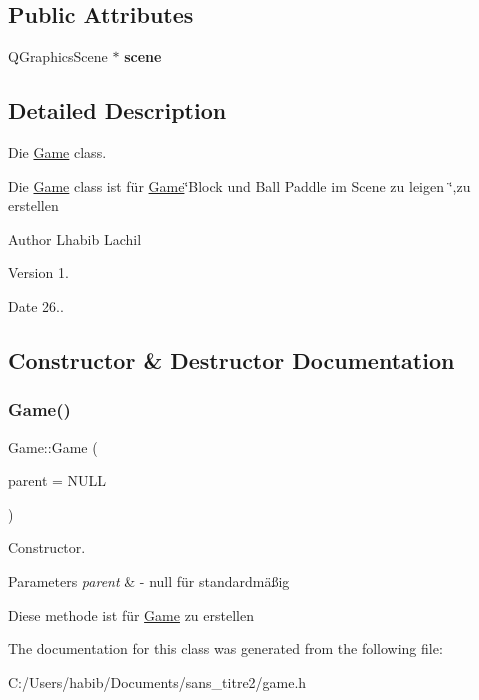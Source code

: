\subsection*{Public Attributes}
\begin{DoxyCompactItemize}
\item 
\mbox{\label{class_game_a8119e3b9a632906c6808fa294b46a92a}} 
Q\+Graphics\+Scene $\ast$ {\bfseries scene}
\end{DoxyCompactItemize}


\subsection{Detailed Description}
Die \hyperlink{class_game}{Game} class. 

Die \hyperlink{class_game}{Game} class ist für \hyperlink{class_game}{Game}\char`\"{}\+Block und Ball Paddle im Scene zu leigen \char`\"{},zu erstellen \begin{DoxyAuthor}{Author}
Lhabib Lachil 
\end{DoxyAuthor}
\begin{DoxyVersion}{Version}
1. 
\end{DoxyVersion}
\begin{DoxyDate}{Date}
26.. 
\end{DoxyDate}


\subsection{Constructor \& Destructor Documentation}
\mbox{\label{class_game_a32d7e09112c37ff84736ea797c1eb7f0}} 
\subsubsection{\texorpdfstring{Game()}{Game()}}
{\footnotesize\ttfamily Game\+::\+Game (\begin{DoxyParamCaption}\item[{Q\+Widget $\ast$}]{parent = {\ttfamily NULL} }\end{DoxyParamCaption})\hspace{0.3cm}{\ttfamily [inline]}}



Constructor. 


\begin{DoxyParams}{Parameters}
{\em parent} & -\/ null für standardmäßig\\
\hline
\end{DoxyParams}
Diese methode ist für \hyperlink{class_game}{Game} zu erstellen 

The documentation for this class was generated from the following file\+:\begin{DoxyCompactItemize}
\item 
C\+:/\+Users/habib/\+Documents/sans\+\_\+titre2/game.\+h\end{DoxyCompactItemize}
